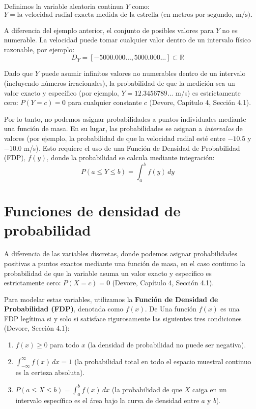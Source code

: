 Definimos la variable aleatoria continua $Y$ como:
$$ Y = \text{la velocidad radial exacta medida de la estrella (en metros por segundo, m/s).} $$

A diferencia del ejemplo anterior, el conjunto de posibles valores para $Y$ no es numerable. La velocidad puede tomar cualquier valor dentro de un intervalo físico razonable, por ejemplo:
$$ D_Y = [-5000.000\dots, 5000.000\dots] \subset \mathbb{R} $$

Dado que $Y$ puede asumir infinitos valores no numerables dentro de un intervalo (incluyendo números irracionales), la probabilidad de que la medición sea un valor exacto y específico (por ejemplo, $Y = 12.3456789\dots$ m/s) es estrictamente cero: $P(Y = c) = 0$ para cualquier constante $c$ (Devore, Capítulo 4, Sección 4.1). 

Por lo tanto, no podemos asignar probabilidades a puntos individuales mediante una función de masa. En su lugar, las probabilidades se asignan a \textit{intervalos} de valores (por ejemplo, la probabilidad de que la velocidad radial esté entre $-10.5$ y $-10.0$ m/s). Esto requiere el uso de una Función de Densidad de Probabilidad (FDP), $f(y)$, donde la probabilidad se calcula mediante integración:
$$ P(a \le Y \le b) = \int_{a}^{b} f(y) \, dy $$

\section{Funciones de densidad de probabilidad}

A diferencia de las variables discretas, donde podemos asignar probabilidades positivas a puntos exactos mediante una función de masa, en el caso continuo la probabilidad de que la variable asuma un valor exacto y específico es estrictamente cero: $P(X = c) = 0$ (Devore, Capítulo 4, Sección 4.1). 

Para modelar estas variables, utilizamos la \textbf{Función de Densidad de Probabilidad (FDP)}, denotada como $f(x)$. De Una función $f(x)$ es una FDP legítima si y solo si satisface rigurosamente las siguientes tres condiciones (Devore, Sección 4.1):
\begin{enumerate}
    \item $f(x) \ge 0$ para todo $x$ (la densidad de probabilidad no puede ser negativa).
    \item $\int_{-\infty}^{\infty} f(x) \, dx = 1$ (la probabilidad total en todo el espacio muestral continuo es la certeza absoluta).
    \item $P(a \le X \le b) = \int_{a}^{b} f(x) \, dx$ (la probabilidad de que $X$ caiga en un intervalo específico es el área bajo la curva de densidad entre $a$ y $b$).
\end{enumerate}

